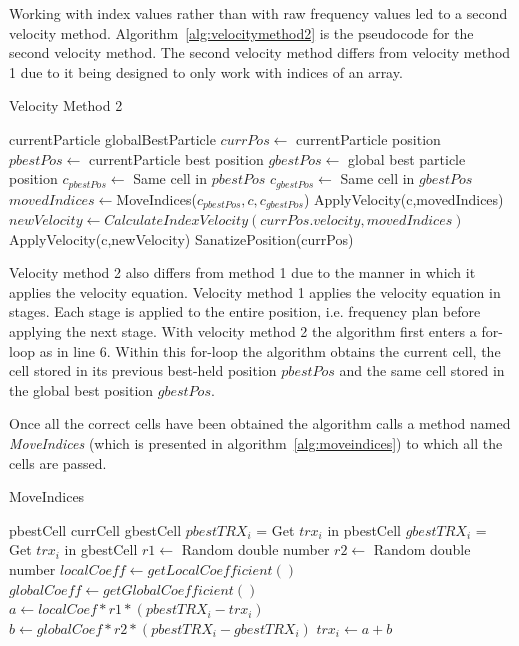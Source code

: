 Working with index values rather than with raw frequency values led to  a second velocity method. Algorithm~\ref{alg:velocitymethod2} is the pseudocode for the second velocity method. The second velocity method differs from velocity method 1 due to it being designed to only work with indices of an array.
\begin{algorithm}[H]
\caption{Velocity Method 2}
\label{alg:velocitymethod2}
\begin{algorithmic}[1]
	\Require currentParticle
	\Require globalBestParticle
	\State $currPos \leftarrow$ currentParticle position
	\State $pbestPos \leftarrow$ currentParticle best position
	\State $gbestPos \leftarrow$ global best particle position
		\State $c_{pbestPos} \leftarrow $ Same cell in $pbestPos$
		\State $c_{gbestPos} \leftarrow $ Same cell in $gbestPos$
		\State $movedIndices \leftarrow $MoveIndices($c_{pbestPos},c,c_{gbestPos}$)
			\State ApplyVelocity(c,movedIndices)
		\Else
			\State $newVelocity \leftarrow CalculateIndexVelocity(currPos.velocity,movedIndices)$
			\State ApplyVelocity(c,newVelocity)
		\EndIf
	\EndFor
	\State SanatizePosition(currPos)
\end{algorithmic}
\end{algorithm}

Velocity method 2 also differs from method 1 due to the manner in which it applies the velocity equation. Velocity method 1 applies the velocity equation in stages. Each stage is applied to the entire position, i.e. frequency plan before applying the next stage. With velocity method 2 the algorithm first enters a for-loop as in line 6. Within this for-loop the algorithm obtains the current cell, the cell stored in its previous best-held position $pbestPos$ and the same cell stored in the global best position $gbestPos$.

Once all the correct cells have been obtained the algorithm calls a method named \emph{MoveIndices} (which is presented in algorithm~\ref{alg:moveindices}) to which all the cells are passed.
\begin{algorithm}
\caption {MoveIndices}
\label{alg:moveindices}
\begin{algorithmic}[1]
	\Require pbestCell
	\Require currCell
	\Require gbestCell
		\State $pbestTRX_i$ = Get $trx_i$ in pbestCell
		\State $gbestTRX_i$ = Get $trx_i$ in gbestCell
		\State $r1 \leftarrow$ Random double number
		\State $r2 \leftarrow$ Random double number
		\State $localCoeff \leftarrow getLocalCoefficient()$
		\State $globalCoeff \leftarrow getGlobalCoefficient()$
		\State $a \leftarrow localCoef * r1 * (pbestTRX_i - trx_i)$
		\State $b \leftarrow globalCoef * r2 * (pbestTRX_i - gbestTRX_i)$
		\State $trx_i \leftarrow a + b$
	\EndFor
\end{algorithmic}
\end{algorithm}

